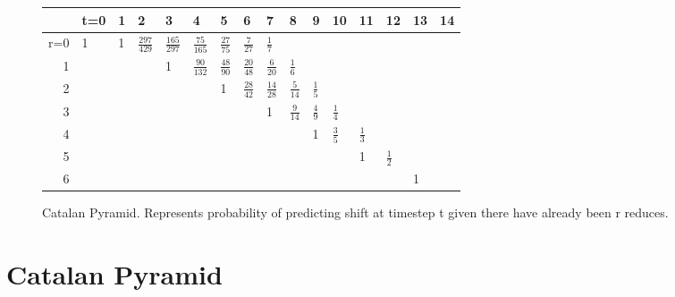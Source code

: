 \documentclass[11pt,a4paper]{article}
\begin{document}


\begin{figure}[t]
\small
\centering
\begin{tabular}{|r|l|l|l|l|l|l|l|l|l|l|l|l|l|l|l|}
\hline & t=0 & 1 & 2 & 3 & 4 & 5 & 6 & 7 & 8 & 9 & 10 & 11 & 12 & 13 & 14 \\ \hline
r=0 & 1 & 1 & $\frac{297}{429}$ & $\frac{165}{297}$ & $\frac{75}{165}$ & $\frac{27}{75}$ & $\frac{7}{27}$ & $\frac{1}{7}$ &   &   &   &   &   &   &   \\
1 &   &   &   & 1 & $\frac{90}{132}$ & $\frac{48}{90}$ & $\frac{20}{48}$ & $\frac{6}{20}$ & $\frac{1}{6}$ &   &   &   &   &   &   \\
2 &   &   &   &   &   & 1 & $\frac{28}{42}$ & $\frac{14}{28}$ & $\frac{5}{14}$ & $\frac{1}{5}$ &   &   &   &   &   \\
3 &   &   &   &   &   &   &   & 1 & $\frac{9}{14}$ & $\frac{4}{9}$ & $\frac{1}{4}$ &   &   &   &   \\
4 &   &   &   &   &   &   &   &   &   & 1 & $\frac{3}{5}$ & $\frac{1}{3}$ &   &   &   \\
5 &   &   &   &   &   &   &   &   &   &   &   & 1 & $\frac{1}{2}$ &   &   \\
6 &   &   &   &   &   &   &   &   &   &   &   &   &   & 1 &   \\
\hline
\end{tabular}
\caption{Catalan Pyramid. Represents probability of predicting shift at timestep t given there have already been r reduces.}
\label{tab:catalan}
\end{figure}

\section{Catalan Pyramid}
\end{document}
